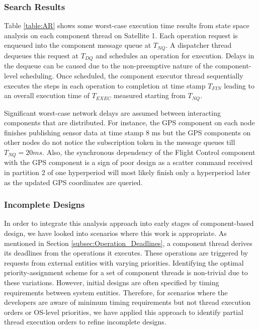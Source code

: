 \subsubsection{Search Results}

Table \ref{table:AR} shows some worst-case execution time results from state space analysis on each component thread on Satellite 1. Each operation request is enqueued into the component message queue at $T_{NQ}$. A dispatcher thread dequeues this request at $T_{DQ}$ and schedules an operation for execution. Delays in the dequeue can be caused due to the non-preemptive nature of the component-level scheduling. Once scheduled, the component executor thread sequentially executes the steps in each operation to completion at time stamp $T_{FIN}$ leading to an overall execution time of $T_{EXEC}$ measured starting from $T_{NQ}$. 

Significant worst-case network delays are assumed between interacting components that are distributed. For instance, the GPS component on each node finishes publishing sensor data at time stamp 8 ms but the GPS components on other nodes do not notice the subscription token in the message queues till $T_{NQ} = 20 ms$. Also, the synchronous dependency of the Flight Control component with the GPS component is a sign of poor design as a scatter command received in partition 2 of one hyperperiod will most likely finish only a hyperperiod later as the updated GPS coordinates are queried. 

\subsubsection{Incomplete Designs}

In order to integrate this analysis approach into early stages of component-based design, we have looked into scenarios where this work is appropriate. As mentioned in Section \ref{subsec:Operation_Deadlines}, a component thread derives its deadlines from the operations it executes. These operations are triggered by requests from external entities with varying priorities. Identifying the optimal priority-assignment scheme for a set of component threads is non-trivial due to these variations. However, initial designs are often specified by timing requirements between system entities. Therefore, for scenarios where the developers are aware of minimum timing requirements but not thread execution orders or OS-level priorities, we have applied this approach to identify partial thread execution orders to refine incomplete designs. 

